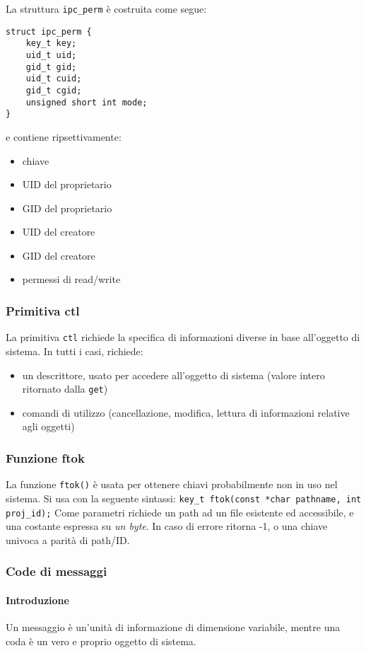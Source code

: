 \documentclass[a4paper, 10pt]{article}
\begin{document}
La struttura \verb|ipc_perm| è costruita come segue:
\begin{verbatim}
struct ipc_perm {
    key_t key;
    uid_t uid;
    gid_t gid;
    uid_t cuid;
    gid_t cgid;
    unsigned short int mode;
}
\end{verbatim}
e contiene ripsettivamente:
\begin{itemize}
\item chiave
\item UID del proprietario
\item GID del proprietario
\item UID del creatore
\item GID del creatore
\item permessi di read/write
\end{itemize}

\subsubsection{Primitiva ctl}
La primitiva \verb|ctl| richiede la specifica di informazioni diverse in base all'oggetto di sistema.
In tutti i casi, richiede:
\begin{itemize}
\item un descrittore, usato per accedere all'oggetto di sistema (valore intero ritornato dalla \verb|get|)
\item comandi di utilizzo (cancellazione, modifica, lettura di informazioni relative agli oggetti)
\end{itemize}

\subsubsection{Funzione ftok}
La funzione \verb|ftok()| è usata per ottenere chiavi probabilmente non in uso nel sistema.
Si usa con la seguente sintassi:
\verb|key_t ftok(const *char pathname, int proj_id);|
Come parametri richiede un path ad un file esistente ed accessibile, e una costante espressa su \textit{un byte}.
In caso di errore ritorna -1, o una chiave univoca a parità di path/ID.

\subsubsection{Code di messaggi}
\paragraph{Introduzione}
Un messaggio è un'unità di informazione di dimensione variabile, mentre una coda è un vero e proprio oggetto di sistema. 
\end{document}
